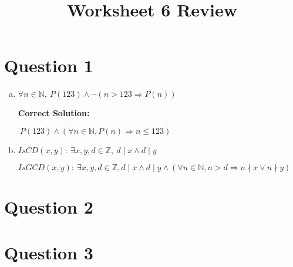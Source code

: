 \documentclass[12pt]{article}
\begin{document}
\title{Worksheet 6 Review}
\maketitle

\section*{Question 1}
\begin{enumerate}[a.]
    \item

    $\forall n \in \mathbb{N},\:P(123) \land \neg (n > 123 \Rightarrow P(n))$

    \bigskip

    \textbf{Correct Solution:}

    $\:P(123) \land (\forall n \in \mathbb{N}, P(n) \Rightarrow n \leq 123)$

    \item

    $IsCD(x,y):\:\exists x,y,d \in \mathbb{Z},\: d \mid x \land d \mid y$

    \bigskip

    $IsGCD(x,y):\:\exists x,y,d \in \mathbb{Z}, d \mid x \land d \mid y \land
    (\forall n \in \mathbb{N}, n > d \Rightarrow n \nmid x \lor n \nmid y)$


\end{enumerate}

\section*{Question 2}

\section*{Question 3}
\end{document}
